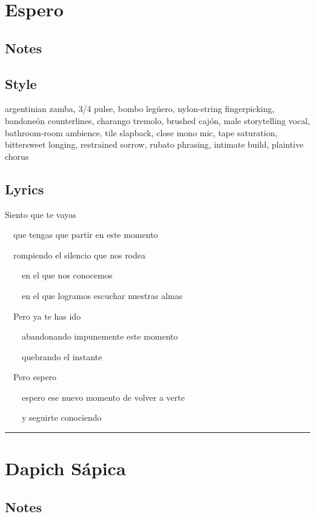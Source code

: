 \documentclass[]{article}
\begin{document}
\section{Espero}\label{espero}

\subsection{Notes}\label{notes-35}

\subsection{Style}\label{style-35}

argentinian zamba, 3/4 pulse, bombo legüero, nylon-string fingerpicking,
bandoneón counterlines, charango tremolo, brushed cajón, male
storytelling vocal, bathroom-room ambience, tile slapback, close mono
mic, tape saturation, bittersweet longing, restrained sorrow, rubato
phrasing, intimate build, plaintive chorus

\subsection{Lyrics}\label{lyrics-35}

Siento que te vayas\\
\strut ~~que tengas que partir en este momento\\
\strut ~~rompiendo el silencio que nos rodea\\
\strut ~~~~en el que nos conocemos\\
\strut ~~~~en el que logramos escuchar nuestras almas

~~Pero ya te has ido\\
\strut ~~~~abandonando impunemente este momento\\
\strut ~~~~quebrando el instante

~~Pero espero\\
\strut ~~~~espero ese nuevo momento de volver a verte\\
\strut ~~~~y seguirte conociendo

\begin{center}\rule{0.5\linewidth}{0.5pt}\end{center}

\section{Dapich Sápica}\label{dapich-suxe1pica}

\subsection{Notes}\label{notes-36}
\end{document}
